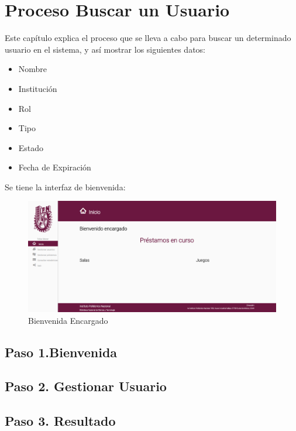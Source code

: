 \chapter{Proceso Buscar un Usuario}
	Este capítulo explica el proceso que se lleva a cabo para buscar
	un determinado usuario en el sistema, y así mostrar los siguientes datos:
	
	\begin{itemize}
	\item Nombre
	\item Institución
	\item Rol
	\item Tipo
	\item Estado
	\item Fecha de Expiración
	
	\end{itemize}
	
	Se tiene la interfaz de bienvenida:
	\begin{figure}[hbtp]
		
		\includegraphics[scale=0.3]{images/Interfaz/IUGS02_binevenida.png}
		\caption{Bienvenida Encargado}
	\end{figure}


\section{Paso 1.Bienvenida}
	

\section{Paso 2. Gestionar Usuario}
	
	
\section{Paso 3. Resultado}
	
	
